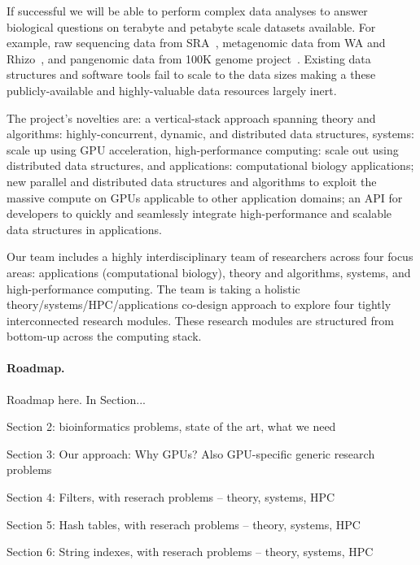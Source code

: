 
If successful we will be able to perform complex data analyses to answer biological questions on terabyte and petabyte scale datasets available. For example, raw sequencing data from SRA~\cite{kodama2012sequence}, metagenomic data from WA and Rhizo~\cite{hofmeyr2020terabase}, and pangenomic data from 100K genome project~\cite{XXX}. Existing data structures and software tools fail to scale to the data sizes making a these publicly-available and highly-valuable data resources largely inert.


The project’s novelties are: a vertical-stack approach spanning theory and algorithms: highly-concurrent, dynamic, and distributed data structures, systems: scale up using GPU acceleration, high-performance computing: scale out using distributed data structures, and applications: computational biology applications; new parallel and distributed data structures and algorithms to exploit the massive compute on GPUs applicable to other application domains; an API for developers to quickly and seamlessly integrate high-performance and scalable data structures in applications.

Our team includes a highly interdisciplinary team of researchers across four focus areas: applications (computational biology), theory and algorithms, systems, and high-performance computing. The team is taking a holistic theory/systems/HPC/applications co-design approach to explore four tightly interconnected research modules. These research modules are structured from bottom-up across the computing stack.


\paragraph{Roadmap.} Roadmap here. In Section...

Section 2: bioinformatics problems, state of the art, what we need

Section 3: Our approach: Why GPUs?  Also GPU-specific generic research problems

Section 4: Filters, with reserach problems -- theory, systems, HPC

Section 5: Hash tables, with reserach problems -- theory, systems, HPC

Section 6: String indexes, with reserach problems -- theory, systems, HPC

